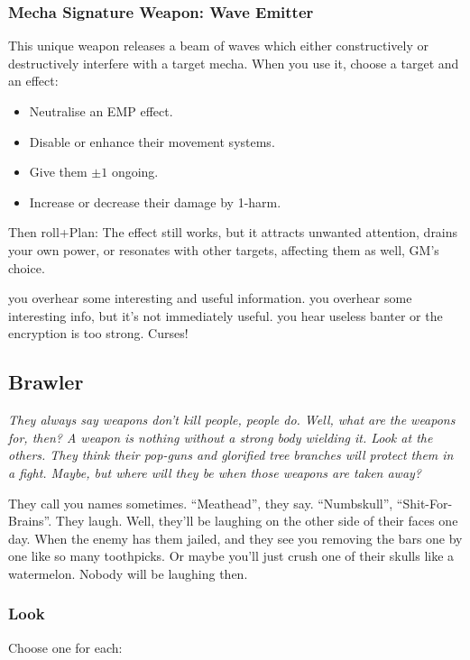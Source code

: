 \subsubsection{Mecha Signature Weapon: Wave Emitter}
This unique weapon releases a beam of waves which either constructively or destructively interfere with a target mecha. When you use it, choose a target and an effect:
\begin{itemize}
\item Neutralise an EMP effect.
\item Disable or enhance their movement systems.
\item Give them $\pm 1$ ongoing.
\item Increase or decrease their damage by 1-harm.
\end{itemize}
Then roll+Plan:
{The effect still works, but it attracts unwanted attention, drains your own power, or resonates with other targets, affecting them as well, GM's choice.}

{you overhear some interesting and useful information.}
{you overhear some interesting info, but it's not immediately useful.}
{you hear useless banter or the encryption is too strong. Curses!}



\subsection{Brawler}
{\itshape They always say weapons don't kill people, people do. Well,
  what are the weapons for, then? A weapon is nothing without a strong
  body wielding it. Look at the others. They think their pop-guns and
  glorified tree branches will protect them in a fight. Maybe, but
  where will they be when those weapons are taken away?

They call you names sometimes. ``Meathead'', they say. ``Numbskull'',
``Shit-For-Brains''. They laugh. Well, they'll be laughing on the
other side of their faces one day. When the enemy has them jailed, and
they see you removing the bars one by one like so many toothpicks. Or
maybe you'll just crush one of their skulls like a watermelon. Nobody
will be laughing then.}

\subsubsection{Look}
Choose one for each:

